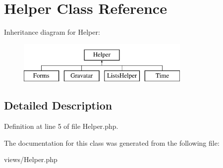 \hypertarget{class_helper}{
\section{Helper Class Reference}
\label{class_helper}
}
Inheritance diagram for Helper:\begin{figure}[H]
\begin{center}
\leavevmode
\includegraphics[height=2.000000cm]{class_helper}
\end{center}
\end{figure}


\subsection{Detailed Description}


Definition at line 5 of file Helper.php.



The documentation for this class was generated from the following file:\begin{DoxyCompactItemize}
\item 
views/Helper.php\end{DoxyCompactItemize}
